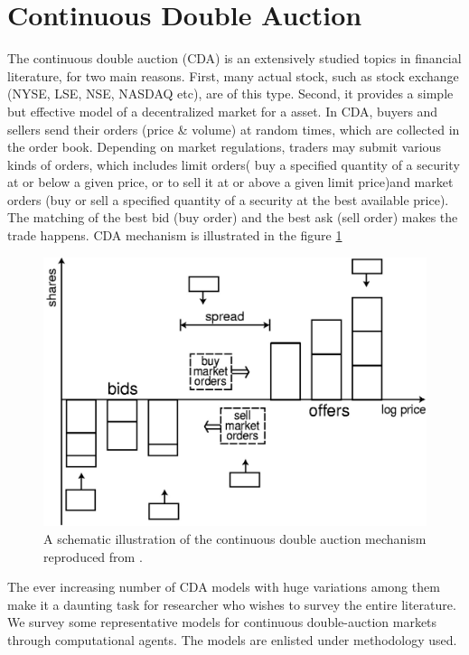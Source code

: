 \documentclass[12pt,a4paper]{article}
\numberwithin{equation}{section}
\numberwithin{figure}{section}
\numberwithin{table}{section}
\begin{document}
\section{Continuous Double Auction}\label{sec:cda}
The continuous double auction (CDA) is an extensively studied topics in financial literature, for two main reasons. First, many actual stock, such as stock exchange (NYSE, LSE, NSE, NASDAQ etc), are of this type. Second, it provides a simple but effective model of a decentralized market for a asset. In CDA, buyers and sellers send their orders (price \& volume) at random times, which are collected in the order book. Depending on market regulations, traders may submit various kinds of orders, which includes limit orders( buy a specified quantity of a security at or below a given price, or to sell it at or above a given limit price)and market orders (buy or sell a specified quantity of a security at the best available price). The matching of the best bid (buy order) and the best ask (sell order) makes the trade happens. CDA mechanism is illustrated in the figure \ref{fig:CDA}
\begin{figure}[ht]
\begin{center}
\includegraphics[width=\textwidth]{CDA}
\caption{A schematic illustration of the continuous double auction mechanism reproduced from \citet{SmithFarmerGillemotKrishnamurty2003}.}
\label{fig:CDA}
\end{center}
\end{figure}

The ever increasing number of CDA models with huge variations among them make it a daunting task for researcher who wishes to survey the entire literature. We survey some representative models for continuous double-auction markets through computational agents. The models are enlisted under methodology used. 
\end{document}
